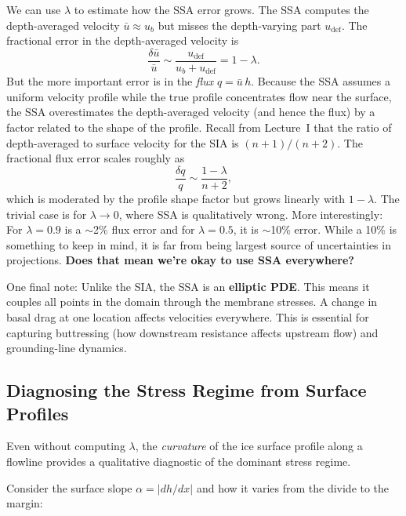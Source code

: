 \documentclass[11pt]{article}
\begin{document}
\medskip
\noindent We can use $\lambda$ to estimate how the SSA error grows.  The SSA computes the depth-averaged velocity $\bar{u} \approx u_b$ but misses the depth-varying part $u_{\text{def}}$.  The fractional error in the depth-averaged velocity is
\begin{equation}
  \frac{\delta \bar{u}}{\bar{u}} \sim \frac{u_{\text{def}}}{u_b + u_{\text{def}}} = 1 - \lambda.
\end{equation}
But the more important error is in the \emph{flux} $q = \bar{u}\,h$.  Because the SSA assumes a uniform velocity profile while the true profile concentrates flow near the surface, the SSA overestimates the depth-averaged velocity (and hence the flux) by a factor related to the shape of the profile.  Recall from Lecture~I that the ratio of depth-averaged to surface velocity for the SIA is $(n+1)/(n+2)$.  The fractional flux error scales roughly as
\begin{equation}
  \frac{\delta q}{q} \sim \frac{1 - \lambda}{n + 2},
\end{equation}
which is moderated by the profile shape factor but grows linearly with $1 - \lambda$. The trivial case is for $\lambda \to 0$, where SSA is qualitatively wrong. More interestingly: For $\lambda = 0.9$ is a $\sim$2\% flux error and for $\lambda = 0.5$, it is $\sim$10\% error. While a 10\% is something to keep in mind, it is far from being largest source of uncertainties in projections. \textbf{Does that mean we're okay to use SSA everywhere?}


\medskip
\noindent One final note: Unlike the SIA, the SSA is an \textbf{elliptic PDE}. This means it couples all points in the domain through the membrane stresses.  A change in basal drag at one location affects velocities everywhere.  This is essential for capturing buttressing (how downstream resistance affects upstream flow) and grounding-line dynamics.

\subsection{Diagnosing the Stress Regime from Surface Profiles}

Even without computing $\lambda$, the \emph{curvature} of the ice surface profile along a flowline provides a qualitative diagnostic of the dominant stress regime.

\medskip
\noindent Consider the surface slope $\alpha = |dh/dx|$ and how it varies from the divide to the margin:
\end{document}
